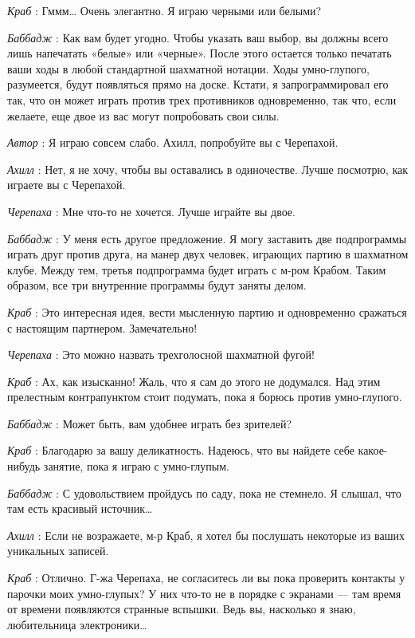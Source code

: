 \documentclass[../main.tex]{subfiles}
\begin{document}
\begin{dialogue}
\emph{Краб} : Гммм\ldots{} Очень элегантно. Я играю черными или белыми?

\emph{Баббадж} : Как вам будет угодно. Чтобы указать ваш выбор, вы должны всего лишь напечатать «белые» или «черные». После этого остается только печатать ваши ходы в любой стандартной шахматной нотации. Ходы умно-глупого, разумеется, будут появляться прямо на доске. Кстати, я запрограммировал его так, что он может играть против трех противников одновременно, так что, если желаете, еще двое из вас могут попробовать свои силы.

\emph{Автор} : Я играю совсем слабо. Ахилл, попробуйте вы с Черепахой.

\emph{Ахилл} : Нет, я не хочу, чтобы вы оставались в одиночестве. Лучше посмотрю, как играете вы с Черепахой.

\emph{Черепаха} : Мне что-то не хочется. Лучше играйте вы двое.

\emph{Баббадж} : У меня есть другое предложение. Я могу заставить две подпрограммы играть друг против друга, на манер двух человек, играющих партию в шахматном клубе. Между тем, третья подпрограмма будет играть с м-ром Крабом. Таким образом, все три внутренние программы будут заняты делом.

\emph{Краб} : Это интересная идея, вести мысленную партию и одновременно сражаться с настоящим партнером. Замечательно!

\emph{Черепаха} : Это можно назвать трехголосной шахматной фугой!

\emph{Краб} : Ах, как изысканно! Жаль, что я сам до этого не додумался. Над этим прелестным контрапунктом стоит подумать, пока я борюсь против умно-глупого.

\emph{Баббадж} : Может быть, вам удобнее играть без зрителей?

\emph{Краб} : Благодарю за вашу деликатность. Надеюсь, что вы найдете себе какое-нибудь занятие, пока я играю с умно-глупым.

\emph{Баббадж} : С удовольствием пройдусь по саду, пока не стемнело. Я слышал, что там есть красивый источник\ldots{}

\emph{Ахилл} : Если не возражаете, м-р Краб, я хотел бы послушать некоторые из ваших уникальных записей.

\emph{Краб} : Отлично. Г-жа Черепаха, не согласитесь ли вы пока проверить контакты у парочки моих умно-глупых? У них что-то не в порядке с экранами --- там время от времени появляются странные вспышки. Ведь вы, насколько я знаю, любительница электроники\ldots{}


\end{dialogue}
\end{document}
